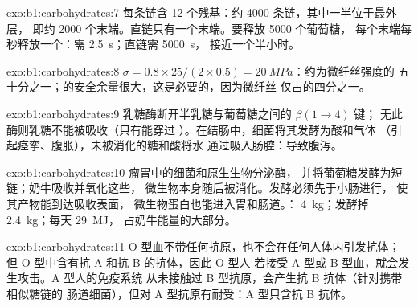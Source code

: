 \begin{solution}{exo:b1:carbohydrates:7}
每条链含 12 个残基：约 \num{4000} 条链，其中一半位于最外层，
即约 \num{2000} 个末端。直链只有一个末端。要释放 \num{5000} 个葡萄糖，
每个末端每秒释放一个：需 \qty{2.5}{s}；直链需 \qty{5000}{s}，
接近一个半小时。
\end{solution}

\begin{solution}{exo:b1:carbohydrates:8}
$\sigma = 0.8\times 25/(2\times 0.5) = \qty{20}{MPa}$：约为微纤丝强度的
五十分之一；的安全余量很大，这是必要的，因为微纤丝
仅占的四分之一。
\end{solution}

\begin{solution}{exo:b1:carbohydrates:9}
乳糖酶断开半乳糖与葡萄糖之间的 $\beta(1{\to}4)$ 键；
无此酶则乳糖不能被吸收（只有能穿过
）。在结肠中，细菌将其发酵为酸和气体
（引起痉挛、腹胀），未被消化的糖和酸将水
通过吸入肠腔：导致腹泻。
\end{solution}

\begin{solution}{exo:b1:carbohydrates:10}
瘤胃中的细菌和原生生物分泌酶，
并将葡萄糖发酵为短链；奶牛吸收并氧化这些，
微生物本身随后被消化。发酵必须先于小肠进行，
使其产物能到达吸收表面，
微生物蛋白也能进入胃和肠道。：
\qty{4}{kg}；发酵掉 \qty{2.4}{kg}；每天 \qty{29}{MJ}，
占奶牛能量的大部分。
\end{solution}

\begin{solution}{exo:b1:carbohydrates:11}
O 型血不带任何抗原，也不会在任何人体内引发抗体；
但 O 型中含有抗 A 和抗 B 的抗体，因此 O 型人
若接受 A 型或 B 型血，就会发生攻击。A 型人的免疫系统
从未接触过 B 型抗原，会产生抗 B 抗体（针对携带相似糖链的
肠道细菌），但对 A 型抗原有耐受：A 型只含抗 B 抗体。
\end{solution}

